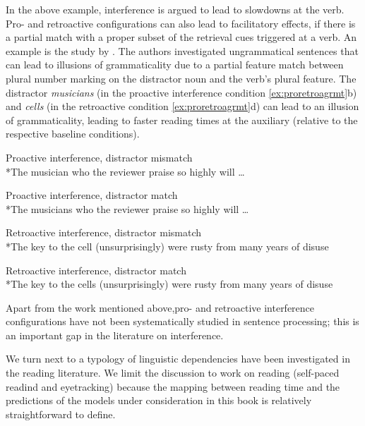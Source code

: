 \documentclass{cambridge7A}\usepackage[]{graphicx}\usepackage[]{color}
\begin{document}
In the above example, interference is argued to lead to slowdowns at the verb.
Pro- and retroactive configurations can also lead to facilitatory effects, if there is a partial match with a proper subset of the retrieval cues triggered at a verb.  An example is the study by \cite{WagersLauPhillips2009}. The authors investigated ungrammatical sentences that can lead to illusions of grammaticality due to a partial feature match between plural number marking on the distractor noun and the verb's plural feature.
The distractor \textit{musicians} (in the proactive interference condition \ref{ex:proretroagrmt}b) and \textit{cells} (in the retroactive condition \ref{ex:proretroagrmt}d) can lead to an illusion of grammaticality, leading to faster reading times at the auxiliary (relative to the respective baseline conditions).

\begin{exe}
\ex \label{ex:proretroagrmt}
\begin{xlist}
\item Proactive interference, distractor mismatch\\
*The musician who the reviewer praise so highly will \dots
\item Proactive interference, distractor match\\
*The musicians who the reviewer praise so highly will \dots
\item Retroactive interference, distractor mismatch\\
*The key to the cell (unsurprisingly) were rusty from many years of disuse 
\item Retroactive interference, distractor match\\
*The key to the cells (unsurprisingly) were rusty from many years of disuse
\end{xlist}
\end{exe}

 
Apart from the work mentioned above,pro- and retroactive interference configurations have not been systematically studied in sentence processing; this is an important gap in the literature on interference.  

We turn next to a typology of linguistic dependencies have been investigated in the reading literature. We limit the discussion to work on reading (self-paced readind and eyetracking) because the mapping between  reading time and the predictions of the models under consideration in this book is relatively straightforward to define.
\end{document}
